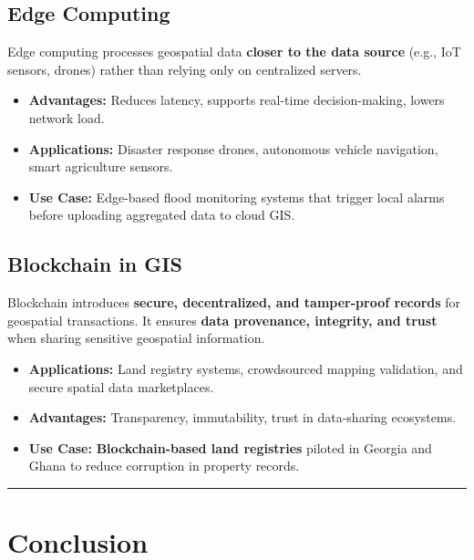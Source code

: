 \documentclass[
  11pt,
  letterpaper,
]{book}
\providecommand{\tightlist}{%
  \setlength{\itemsep}{0pt}\setlength{\parskip}{0pt}}
\begin{document}
\subsection{Edge Computing}\label{edge-computing}

Edge computing processes geospatial data \textbf{closer to the data
source} (e.g., IoT sensors, drones) rather than relying only on
centralized servers.

\begin{itemize}
\tightlist
\item
  \textbf{Advantages:} Reduces latency, supports real-time
  decision-making, lowers network load.\\
\item
  \textbf{Applications:} Disaster response drones, autonomous vehicle
  navigation, smart agriculture sensors.\\
\item
  \textbf{Use Case:} Edge-based flood monitoring systems that trigger
  local alarms before uploading aggregated data to cloud GIS.
\end{itemize}

\subsection{Blockchain in GIS}\label{blockchain-in-gis}

Blockchain introduces \textbf{secure, decentralized, and tamper-proof
records} for geospatial transactions. It ensures \textbf{data
provenance, integrity, and trust} when sharing sensitive geospatial
information.

\begin{itemize}
\tightlist
\item
  \textbf{Applications:} Land registry systems, crowdsourced mapping
  validation, and secure spatial data marketplaces.\\
\item
  \textbf{Advantages:} Transparency, immutability, trust in data-sharing
  ecosystems.\\
\item
  \textbf{Use Case:} \textbf{Blockchain-based land registries} piloted
  in Georgia and Ghana to reduce corruption in property records.
\end{itemize}

\begin{center}\rule{0.5\linewidth}{0.5pt}\end{center}

\section{Conclusion}\label{conclusion-10}
\end{document}
